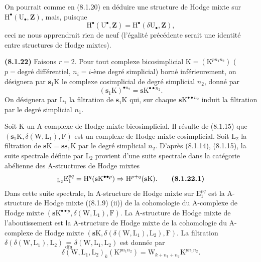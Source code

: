 \documentclass[11pt,leqno]{article}
\begin{document}
On pourrait comme en (8.1.20) en déduire une structure de Hodge mixte sur \(\mathrm{H}^{\bullet}(\mathrm{U}_{\bullet},\mathbf{Z})\), mais, puisque
\[
\mathrm{H}^{\bullet}(\mathrm{U}^{\bullet},\mathbf{Z})
=
\mathrm{H}^{\bullet}(\delta\mathrm{U}_{\bullet},\mathbf{Z}),
\]
ceci ne nous apprendrait rien de neuf (l’égalité précédente serait une identité entre structures de Hodge mixtes).

\textbf{(8.1.22)} Faisons \(r=2\). Pour tout complexe bicosimplicial \(\mathrm{K}=(\mathrm{K}^{p n_{1} n_{2}})\) (\(p=\text{degré}\) différentiel, \(n_i=i\)-ème degré simplicial) borné inférieurement, on désignera par \(\mathbf{s}_{1}\mathrm{K}\) le complexe cosimplicial de degré simplicial \(n_{2}\), donné par
\[
(\mathbf{s}_{1}\mathrm{K})^{\bullet n_{2}}
=
\mathbf{s}\mathrm{K}^{\bullet\bullet n_{2}}.
\]
On désignera par \(\mathrm{L}_{1}\) la filtration de \(\mathbf{s}_{1}\mathrm{K}\) qui, sur chaque \(\mathbf{s}\mathrm{K}^{\bullet\bullet n_{2}}\) induit la filtration par le degré simplicial \(n_{1}\).

Soit \(\mathrm{K}\) un \(\mathrm{A}\)-complexe de Hodge mixte bicosimplicial. Il résulte de (8.1.15) que \((\mathbf{s}_{1}\mathrm{K},\delta(\mathrm{W},\mathrm{L}_{1}),\mathrm{F})\) est un complexe de Hodge mixte cosimplicial. Soit \(\mathrm{L}_{2}\) la filtration de \(\mathbf{s}\mathrm{K}=\mathbf{s}\mathbf{s}_{1}\mathrm{K}\) par le degré simplicial \(n_{2}\). D’après (8.1.14), (8.1.15), la suite spectrale définie par \(\mathrm{L}_{2}\) provient d’une suite spectrale dans la catégorie abélienne des \(\mathrm{A}\)-structures de Hodge mixtes
\[
{}_{\mathrm{L}_{2}}\mathrm{E}_{1}^{pq}
=
\mathrm{H}^{q}(\mathbf{s}\mathrm{K}^{\bullet\bullet p})
\Rightarrow
\mathrm{H}^{p+q}(\mathbf{s}\mathrm{K}).
\tag*{\textbf{(8.1.22.1)}}
\]
Dans cette suite spectrale, la \(\mathrm{A}\)-structure de Hodge mixte sur \(\mathrm{E}_{1}^{pq}\) est la \(\mathrm{A}\)-structure de Hodge mixte ((8.1.9) (ii)) de la cohomologie du \(\mathrm{A}\)-complexe de Hodge mixte \((\mathbf{s}\mathrm{K}^{\bullet\bullet p},\delta(\mathrm{W},\mathrm{L}_{1}),\mathrm{F})\). La \(\mathrm{A}\)-structure de Hodge mixte de l’aboutissement est la \(\mathrm{A}\)-structure de Hodge mixte de la cohomologie du \(\mathrm{A}\)-complexe de Hodge mixte \((\mathbf{s}\mathrm{K},\delta(\delta(\mathrm{W},\mathrm{L}_{1}),\mathrm{L}_{2}),\mathrm{F})\). La filtration \(\delta(\delta(\mathrm{W},\mathrm{L}_{1}),\mathrm{L}_{2})\underset{\mathrm{dfn}}{=}\delta(\mathrm{W},\mathrm{L}_{1},\mathrm{L}_{2})\) est donnée par
\[
\delta(\mathrm{W},\mathrm{L}_{1},\mathrm{L}_{2})_{k}
(\mathrm{K}^{p n_{1} n_{2}})
=
\mathrm{W}_{k+n_{1}+n_{2}}\mathrm{K}^{p n_{1} n_{2}}.
\]
\end{document}
